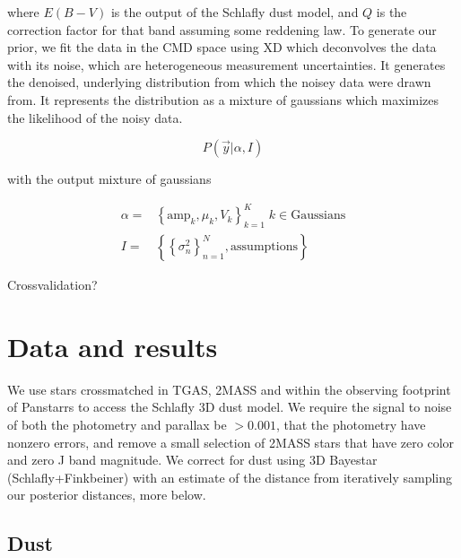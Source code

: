 \documentclass[12pt, preprint]{aastex6}
\begin{document}
where $E(B-V)$ is the output of the Schlafly dust model, and $Q$ is the correction factor for that band assuming some reddening law. To generate our prior, we fit the data in the CMD space using XD which deconvolves the data with its noise, which are heterogeneous measurement uncertainties. It generates the denoised, underlying distribution from which the noisey data were drawn from. It represents the distribution as a mixture of gaussians which maximizes the likelihood of the noisy data.

\begin{equation}
\label{eq:xdlikelihood}
P(\vec{y}|\alpha, I)
\end{equation}

with the output mixture of gaussians

\begin{equation}
\label{eq:xd}
\begin{aligned}
\alpha = &\left\{\mathrm{amp}_k, \mu_k, V_k\right\}_{k=1}^K \; k \in \mathrm{Gaussians} \\
I = &\left\{\left\{\sigma^2_n\right\}_{n=1}^N, \mathrm{assumptions}\right\}
\end{aligned}
\end{equation}


Crossvalidation?

\section{Data and results}

We use stars crossmatched in TGAS, 2MASS and within the observing footprint of Panstarrs to access the Schlafly 3D dust model. We require the signal to noise of both the photometry and parallax be $> 0.001$, that the photometry have nonzero errors, and remove a small selection of 2MASS stars that have zero color and zero J band magnitude. We correct for dust using 3D Bayestar (Schlafly+Finkbeiner) with an estimate of the distance from iteratively sampling our posterior distances, more below.

\subsection{Dust}
\end{document}
